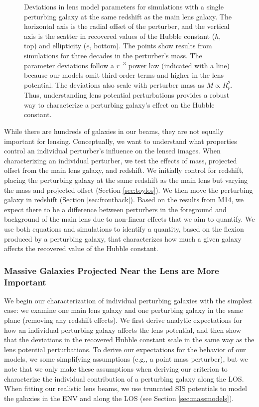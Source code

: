 \documentclass{emulateapj}
\begin{document}
\begin{figure}[t]
\begin{center}
\caption{\label{fig:toyr3} Deviations in lens model parameters for simulations with a single perturbing galaxy at the same redshift as the main lens galaxy.  The horizontal axis is the radial offset of the perturber, and the vertical axis is the scatter in recovered values of the Hubble constant ($h$, top) and ellipticity ($e$, bottom). The points show results from simulations for three decades in the perturber's mass. The parameter deviations follow a $r^{-3}$ power law (indicated with a line) because our models omit third-order terms and higher in the lens potential. The deviations also scale with perturber mass as $M \propto R_p^2$. Thus, understanding lens potential perturbations provides a robust way to characterize a perturbing galaxy's effect on the Hubble constant.%
}
\end{center}
\end{figure}

While there are hundreds of galaxies in our beams, they are not equally important for lensing.  Conceptually, we want to understand what properties control an individual perturber's influence on the lensed images. When characterizing an individual perturber, we test the effects of mass, projected offset from the main lens galaxy, and redshift. We initially control for redshift, placing the perturbing galaxy at the same redshift as the main lens but varying the mass and projected offset (Section \ref{sec:toylos}). We then move the perturbing galaxy in redshift (Section \ref{sec:frontback}). Based on the results from M14, we expect there to be a difference between perturbers in the foreground and background of the main lens due to non-linear effects that we aim to quantify. We use both equations and simulations to identify a quantity, based on the flexion produced by a perturbing galaxy, that characterizes how much a given galaxy affects the recovered value of the Hubble constant.

\subsubsection{Massive Galaxies Projected Near the Lens are More Important \label{sec:toylos}}

We begin our characterization of individual perturbing galaxies with the simplest case: we examine one main lens galaxy and one perturbing galaxy in the same plane (removing any redshift effects). We first derive analytic expectations for how an individual perturbing galaxy affects the lens potential, and then show that the deviations in the recovered Hubble constant scale in the same way as the lens potential perturbations. To derive our expectations for the behavior of our models, we some simplifying assumptions (e.g., a point mass perturber), but we note that we only make these assumptions when deriving our criterion to characterize the individual contribution of a perturbing galaxy along the LOS. When fitting our realistic lens beams, we use truncated SIS potentials to model the galaxies in the ENV and along the LOS (see Section \ref{sec:massmodels}).
\end{document}
